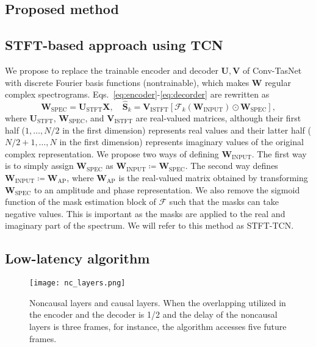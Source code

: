 \documentclass[a4paper]{article}
\begin{document}
\begin{spacing}{0.92}
\vspace{-1mm}
\section{Proposed method}

\subsection{STFT-based approach using TCN}
We propose to replace the trainable encoder and decoder $\mathbf{U},\mathbf{V}$ of Conv-TasNet with discrete Fourier basis functions (nontrainable), which makes $\mathbf{W}$ regular complex spectrograms.
Eqs.~\eqref{eq:encoder}-\eqref{eq:decorder} are rewritten as
\begin{equation}
\mathbf{W}_\text{SPEC} = \mathbf{U}_\text{STFT}\mathbf{X},
\quad
\hat{\mathbf{S}}_k = \mathbf{V}_{\text{ISTFT}} \left[\mathcal{F}_k(\mathbf{W}_\text{INPUT})\odot\mathbf{W}_\text{SPEC}\right],
\label{eq:proposed_method}
\end{equation}
where $\mathbf{U}_\text{STFT}$, $\mathbf{W}_\text{SPEC}$, and $\mathbf{V}_{\text{ISTFT}}$ are real-valued matrices, although their first half ($1,\dots,N/2$ in the first dimension) represents real values and their latter half ($N/2+1,\dots,N$ in the first dimension) represents imaginary values of the original complex representation.
We propose two ways of defining $\mathbf{W}_\text{INPUT}$.
The first way is to simply assign $\mathbf{W}_\text{SPEC}$ as $\mathbf{W}_\text{INPUT} \coloneqq \mathbf{W}_\text{SPEC}$.
The second way defines $\mathbf{W}_\text{INPUT} \coloneqq \mathbf{W}_\text{AP}$, where $\mathbf{W}_\text{AP}$ is the real-valued matrix obtained by transforming $\mathbf{W}_\text{SPEC}$ to an amplitude and phase representation.
We also remove the sigmoid function of the mask estimation block of $\mathcal{F}$ such that the masks can take negative values. 
This is important as the masks are applied to the real and imaginary part of the spectrum.
We will refer to this method as STFT-TCN.

\subsection{Low-latency algorithm}
\begin{figure}
  \centering
  \texttt{[image: nc\_layers.png]}
  \caption{Noncausal layers and causal layers. When the overlapping utilized in the encoder and the decoder is 1/2 and the delay of the noncausal layers is three frames, for instance, the algorithm accesses five future frames.}
\label{fig:nc_layers}
\end{figure}


\end{spacing}
\end{document}
